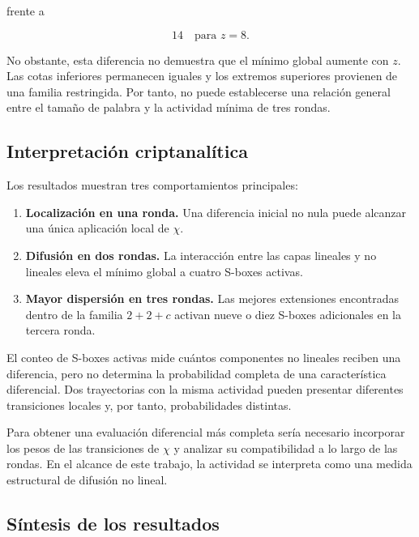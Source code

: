frente a

\[
14
\quad \text{para } z=8.
\]

No obstante, esta diferencia no demuestra que el mínimo global aumente con
$z$. Las cotas inferiores permanecen iguales y los extremos superiores
provienen de una familia restringida. Por tanto, no puede establecerse una
relación general entre el tamaño de palabra y la actividad mínima de tres
rondas.


\subsection{Interpretación criptanalítica}
\label{subsec:interpretacion_criptanalitica}

Los resultados muestran tres comportamientos principales:

\begin{enumerate}
    \item \textbf{Localización en una ronda.}
    Una diferencia inicial no nula puede alcanzar una única aplicación
    local de $\chi$.

    \item \textbf{Difusión en dos rondas.}
    La interacción entre las capas lineales y no lineales eleva el mínimo
    global a cuatro S-boxes activas.

    \item \textbf{Mayor dispersión en tres rondas.}
    Las mejores extensiones encontradas dentro de la familia $2+2+c$
    activan nueve o diez S-boxes adicionales en la tercera ronda.
\end{enumerate}

El conteo de S-boxes activas mide cuántos componentes no lineales reciben
una diferencia, pero no determina la probabilidad completa de una
característica diferencial. Dos trayectorias con la misma actividad pueden
presentar diferentes transiciones locales y, por tanto, probabilidades
distintas.

Para obtener una evaluación diferencial más completa sería necesario
incorporar los pesos de las transiciones de $\chi$ y analizar su
compatibilidad a lo largo de las rondas. En el alcance de este trabajo,
la actividad se interpreta como una medida estructural de difusión no
lineal.


\subsection{Síntesis de los resultados}
\label{subsec:sintesis_resultados}

